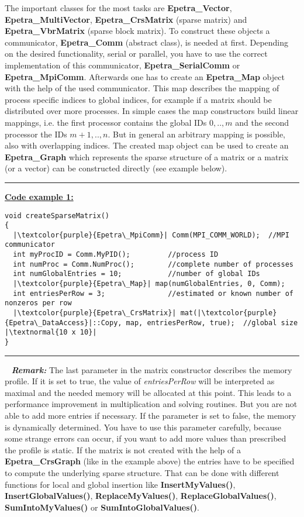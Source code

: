 \documentclass[10pt,a4paper,final,titlepage]{article}
\begin{document}
The important classes for the most tasks are \textbf{Epetra\_Vector}, \textbf{Epetra\_MultiVector}, \textbf{Epetra\_CrsMatrix} (sparse matrix) and \textbf{Epetra\_VbrMatrix} (sparse block matrix). To construct these objects a communicator, \textbf{Epetra\_Comm} (abstract class), is needed at first. Depending on the desired functionality, serial or parallel, you have to use the correct implementation of this communicator, \textbf{Epetra\_SerialComm} or \textbf{Epetra\_MpiComm}. Afterwards one has to create an \textbf{Epetra\_Map} object with the help of the used communicator. This map describes the mapping of process specific indices to global indices, for example if a matrix should be distributed over more processes. In simple cases the map constructors build linear mappings, i.e. the first processor contains the global IDs $0,..,m$ and the second processor the IDs $m+1,..,n$. But in general an arbitrary mapping is possible, also with overlapping indices. The created map object can be used to create an \textbf{Epetra\_Graph} which represents the sparse structure of a matrix or a matrix (or a vector) can be constructed directly (see example below).
\noindent\rule{\textwidth}{0.5pt}
\textbf{\underline{Code example 1:}}
\begin{verbatim}
void createSparseMatrix()
{
  |\textcolor{purple}{Epetra\_MpiComm}| Comm(MPI_COMM_WORLD);  //MPI communicator
  int myProcID = Comm.MyPID();         //process ID
  int numProc = Comm.NumProc();        //complete number of processes
  int numGlobalEntries = 10;           //number of global IDs
  |\textcolor{purple}{Epetra\_Map}| map(numGlobalEntries, 0, Comm);
  int entriesPerRow = 3;               //estimated or known number of nonzeros per row
  |\textcolor{purple}{Epetra\_CrsMatrix}| mat(|\textcolor{purple}{Epetra\_DataAccess}|::Copy, map, entriesPerRow, true);  //global size |\textnormal{10 x 10}|
}
\end{verbatim}
\noindent\rule{\textwidth}{0.5pt}
\newpage \ \newline
\textbf{\textit{Remark:}} The last parameter in the matrix constructor describes the memory profile. If it is set to true, the value of \textit{entriesPerRow} will be interpreted as maximal and the needed memory will be allocated at this point. This leads to a performance improvement in multiplication and solving routines. But you are not able to add more entries if necessary. If the parameter is set to false, the memory is dynamically determined. You have to use this parameter carefully, because some strange errors can occur, if you want to add more values than prescribed the profile is static.
\newline \newline
If the matrix is not created with the help of a \textbf{Epetra\_CrsGraph} (like in the example above) the entries have to be specified to compute the underlying sparse structure. That can be done with different functions for local and global insertion like \textbf{InsertMyValues()}, \textbf{InsertGlobalValues()}, \textbf{ReplaceMyValues()}, \textbf{ReplaceGlobalValues()}, \textbf{SumIntoMyValues()} or \textbf{SumIntoGlobalValues()}.
\end{document}
